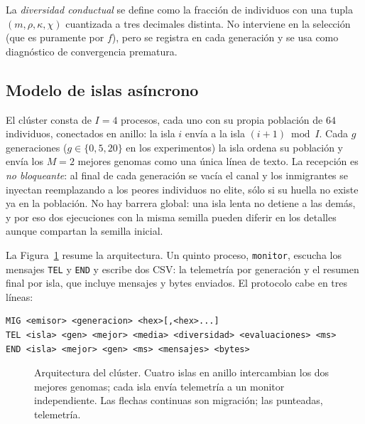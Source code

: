 \documentclass[11pt,a4paper]{article}
\begin{document}
La \emph{diversidad conductual} se define como la fracci\'on de individuos con
una tupla $(m,\rho,\kappa,\chi)$ cuantizada a tres decimales distinta.  No
interviene en la selecci\'on (que es puramente por $f$), pero se registra en cada
generaci\'on y se usa como diagn\'ostico de convergencia prematura.

\subsection{Modelo de islas as\'incrono}

El cl\'uster consta de $I=4$ procesos, cada uno con su propia poblaci\'on de
$64$ individuos, conectados en anillo: la isla $i$ env\'ia a la isla
$(i+1)\bmod I$.  Cada $g$ generaciones ($g\in\{0,5,20\}$ en los experimentos)
la isla ordena su poblaci\'on y env\'ia los $M=2$ mejores genomas como una
\'unica l\'inea de texto.  La recepci\'on es \emph{no bloqueante}: al final de
cada generaci\'on se vac\'ia el canal y los inmigrantes se inyectan reemplazando
a los peores individuos no elite, s\'olo si su huella no existe ya en la
poblaci\'on.  No hay barrera global: una isla lenta no detiene a las dem\'as, y
por eso dos ejecuciones con la misma semilla pueden diferir en los detalles
aunque compartan la semilla inicial.

La Figura~\ref{fig:arch} resume la arquitectura.  Un quinto proceso,
\texttt{monitor}, escucha los mensajes \texttt{TEL} y \texttt{END} y escribe dos
CSV: la telemetr\'ia por generaci\'on y el resumen final por isla, que incluye
mensajes y bytes enviados.  El protocolo cabe en tres l\'ineas:
\begin{lstlisting}[numbers=none,frame=single,aboveskip=4pt,belowskip=4pt]
MIG <emisor> <generacion> <hex>[,<hex>...]
TEL <isla> <gen> <mejor> <media> <diversidad> <evaluaciones> <ms>
END <isla> <mejor> <gen> <ms> <mensajes> <bytes>
\end{lstlisting}

\begin{figure}[t]
\centering
{}
\caption{Arquitectura del cl\'uster.  Cuatro islas en anillo intercambian los
dos mejores genomas; cada isla env\'ia telemetr\'ia a un monitor independiente.
Las flechas continuas son migraci\'on; las punteadas, telemetr\'ia.}
\label{fig:arch}
\end{figure}
\end{document}
